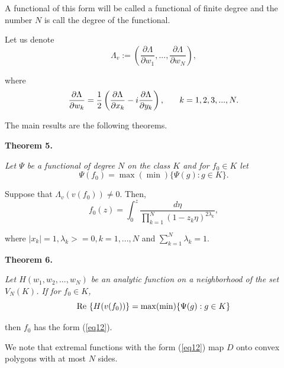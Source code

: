 \documentclass[final]{siamltex}
\begin{document}
\noindent A functional of this form will be called a functional of finite degree and the number $N$ is call the degree of the 
functional.  

Let us denote
$$\Lambda_v := \left ( \frac{\partial \Lambda}{\partial w_1}, . . . , \frac{\partial \Lambda}{\partial w_N} \right ),$$

\noindent where
$$\frac{\partial \Lambda}{\partial w_k} = \frac{1}{2} \left ( \frac{\partial \Lambda}{\partial x_k} - i \frac{\partial \Lambda}{\partial y_k} \right ),
\hspace{0.25in} k = 1, 2, 3, . . . , N.$$

The main results are the following theorems.

\vspace{0.1in}

{\bf Theorem 5.} {\em Let $\Psi$ be a functional of degree $N$ on the class $K$ and for $f_0 \in K$ let 
$$\Psi(f_0) = \max (\min) \{\Psi(g) : g \in K \}.$$

\noindent Suppose that $\Lambda_v(v(f_0)) \neq 0$.  Then,
\begin{equation}
f_0 (z) = \int_0^z \frac{d \eta}{ \prod\limits_{k=1}^{N} (1 - z_k \eta)^{2 \lambda_k} }, \label{eq12}
\end{equation}

\noindent where $|x_k| = 1, \lambda_k >= 0, k = 1, . . . , N$ and $\sum_{k=1}^N \lambda_k = 1$. }

\vspace{0.1in}

{\bf Theorem 6.} {\em Let $H(w_1, w_2, . . . , w_N )$ be an analytic function on a neighborhood of the set $V_N(K)$.
If for $f_0 \in K$,
$${\rm Re}\  \{H(v(f_0)) \} = \max (\min) \{\Psi(g) : g \in K \}$$

\noindent then $f_0$ has the form (\ref{eq12}).}

\vspace{0.1in}

We note that extremal functions with the form (\ref{eq12}) map $D$ onto convex polygons with at most $N$ sides.





\newpage
\end{document}
